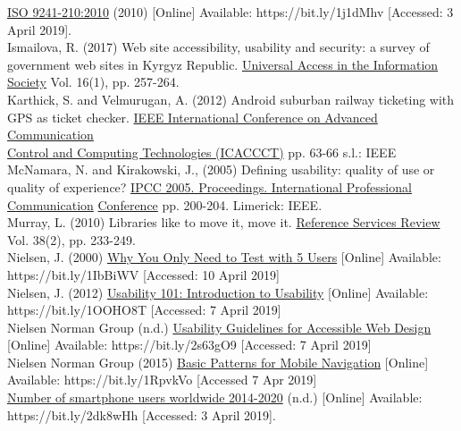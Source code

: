 \documentclass[version=last,fontsize=13pt]{scrartcl}
\begin{document}
\underline{ISO 9241-210:2010} (2010) [Online] Available: https://bit.ly/1j1dMhv [Accessed: 3 April 2019].\\

Ismailova, R. (2017) Web site accessibility, usability and security: a survey of government web sites in Kyrgyz Republic. \underline{Universal Access in the Information Society} Vol. 16(1), pp. 257-264. \\

Karthick, S. and Velmurugan, A. (2012) Android suburban railway ticketing with GPS as ticket checker.  \underline{IEEE International Conference on Advanced Communication }\\ \underline{Control and Computing Technologies (ICACCCT)} pp. 63-66  s.l.: IEEE\\

McNamara, N. and Kirakowski, J., (2005)  Defining usability: quality of use or quality of experience?  \underline{IPCC 2005. Proceedings. International Professional Communication} \underline{Conference} pp. 200-204. Limerick: IEEE.\\

Murray, L. (2010) Libraries like to move it, move it.  \underline{Reference Services Review} Vol. 38(2), pp. 233-249.\\

Nielsen, J. (2000) \underline{Why You Only Need to Test with 5 Users} [Online] Available:\\  https://bit.ly/1IbBiWV [Accessed: 10 April 2019]\\

Nielsen, J. (2012) \underline{Usability 101: Introduction to Usability} [Online] Available:\\ https://bit.ly/1OOHO8T [Accessed: 7 April 2019]\\

Nielsen Norman Group (n.d.) \underline{Usability Guidelines for Accessible Web Design} [Online] Available:  https://bit.ly/2s63gO9 [Accessed: 7 April 2019]\\

Nielsen Norman Group (2015) \underline{Basic Patterns for Mobile Navigation} [Online] Available: https://bit.ly/1RpvkVo [Accessed 7 Apr 2019]\\

\underline{Number of smartphone users worldwide 2014-2020} (n.d.) [Online]  Available:\\ https://bit.ly/2dk8wHh [Accessed: 3 April 2019].\\
\end{document}

